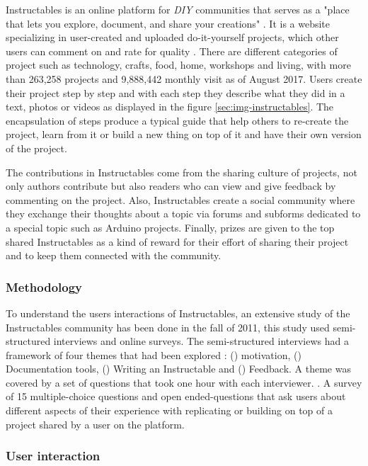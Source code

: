 Instructables is an online platform for \textit{DIY} communities that serves as a "place that lets you explore, document, and share your creations" \cite{web:instructable}. It is a website specializing in user-created and uploaded do-it-yourself projects, which other users can comment on and rate for quality \cite{wiki:instructable} \cite{wiki:instructable}. There are different categories of project such as technology, crafts, food, home, workshops and living, with more than 263,258 projects and 9,888,442 monthly visit as of August 2017. Users create their project step by step and with each step they describe what they did in a text, photos or videos as displayed in the figure \ref{sec:img-instructables}. The encapsulation of steps produce a typical guide that help others to re-create the project, learn from it or build a new thing on top of it and have their own version of the project. 

The contributions in Instructables come from the sharing culture of projects, not only authors contribute but also readers who can view and give feedback by commenting on the project. Also, Instructables create a social community where they exchange their thoughts about a topic via forums and subforms dedicated to a special topic such as Arduino projects. Finally, prizes are given to the top shared Instructables as a kind of reward for their effort of sharing their project and to keep them connected with the community.

\subsubsection{Methodology} 

To understand the users interactions of Instructables, an extensive study of the Instructables community has been done in the fall of 2011, this study used semi-structured interviews and online surveys. The semi-structured interviews had a framework of four themes that had been explored : () motivation, () Documentation tools, () Writing an Instructable and () Feedback. A theme was covered by a set of questions that took one hour with each interviewer. \cite{scholar:Tseng:2014:PVP:2598510.2598540}. A survey of 15 multiple-choice questions and open ended-questions that ask users about different aspects of their experience with replicating or building on top of a project shared by a user on the platform.

\subsubsection{User interaction}

